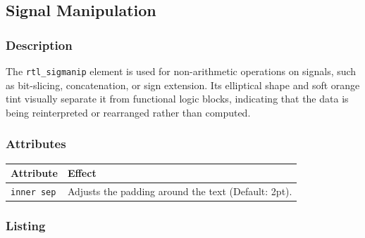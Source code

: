 
\subsection{\sffamily Signal Manipulation}

    \subsubsection{\sffamily Description}
        The \texttt{rtl\_sigmanip} element is used for non-arithmetic operations on signals, such as bit-slicing, concatenation, or sign extension. Its elliptical shape and soft orange tint visually separate it from functional logic blocks, indicating that the data is being reinterpreted or rearranged rather than computed.

    \subsubsection{\sffamily Attributes}
    \begin{center}
        \begin{tabular}{lp{8cm}}
        \toprule
            \textbf{Attribute} & \textbf{Effect} \\
            \midrule
            \texttt{inner sep} & Adjusts the padding around the text (Default: 2pt). \\
            \bottomrule
        \end{tabular}
    \end{center}

    \subsubsection{\sffamily Listing}
\begin{RTLexample}
\end{RTLexample}

